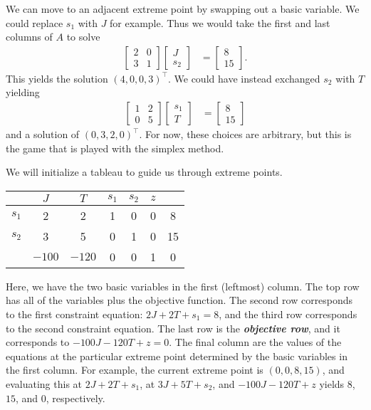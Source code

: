 \documentclass[a4paper, 12pt]{article}
\numberwithin{equation}{section}
\numberwithin{figure}{section}
\theoremstyle{definition}
\newcommand{\define}[1]{\textbf{\textit{#1}}}
\begin{document}
We can move to an adjacent extreme point by swapping out a basic variable. We
could replace $s_1$ with $J$ for example. Thus we would take the first and last
columns of $A$ to solve
\begin{align*}
	\begin{bmatrix}
		2 & 0 \\
		3 & 1 
	\end{bmatrix} \begin{bmatrix}
		J \\ s_2 
	\end{bmatrix} &= \begin{bmatrix}
		8 \\ 15
	\end{bmatrix}.
\end{align*}
This yields the solution $(4, 0, 0, 3)^{\top}$. We could have instead exchanged
$s_2$ with $T$ yielding
\begin{align*}
	\begin{bmatrix}
		1 & 2 \\
		0 & 5 
	\end{bmatrix} \begin{bmatrix}
		s_1 \\ T 
	\end{bmatrix} &= \begin{bmatrix}
		8 \\ 15
	\end{bmatrix}
\end{align*}
and a solution of $(0, 3, 2, 0)^{\top}$. For now, these choices are arbitrary,
but this is the game that is played with the simplex method.

We will initialize a tableau to guide us through extreme points.
\begin{center}
	\begin{tabular}{|c|ccccc|c|}
		\hline
		& $J$ & $T$ & $s_1$ & $s_2$ & $z$ & \\ \hline
		$s_1$ & 2 & 2 & 1 & 0 & 0 & 8 \\ \hline
		$s_2$ & 3 & 5 & 0 & 1 & 0 & 15 \\ \hline 
		& $-100$ & $-120$ & 0 & 0 & 1 & 0 \\ \hline
	\end{tabular}
\end{center}
Here, we have the two basic variables in the first (leftmost) column. The top
row has all of the variables plus the objective function. The second row
corresponds to the first constraint equation: $2J+2T+s_1=8$, and the third row
corresponds to the second constraint equation. The last row is the
\define{objective row}, and it corresponds to $-100J - 120T + z = 0$. The final
column are the values of the equations at the particular extreme point
determined by the basic variables in the first column. For example, the current
extreme point is $(0,0,8,15)$, and evaluating this at $2J+2T+s_1$, at
$3J+5T+s_2$, and $-100J - 120T + z$ yields $8$, $15$, and $0$, respectively.
\end{document}

